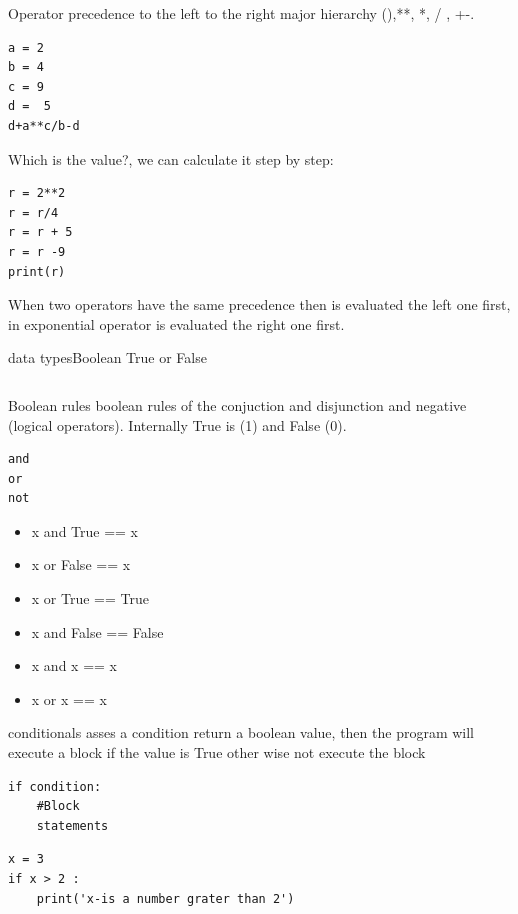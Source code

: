\documentclass{beamer}
\begin{document}
\begin{frame}[fragile]{Operator precedence}
to the left to the right major hierarchy 
(),**, *, / , +-.
\begin{lstlisting}
a = 2
b = 4
c = 9
d =  5
d+a**c/b-d
\end{lstlisting}
Which is the value?, we can calculate it step by step:

\begin{lstlisting}
r = 2**2
r = r/4
r = r + 5
r = r -9
print(r)
\end{lstlisting}
When two operators have the same precedence then is evaluated the left one first, in exponential operator is evaluated the right one first.

\end{frame}






\begin{frame}[fragile]{data types}{Boolean}
True or False
\begin{lstlisting}

\end{lstlisting}
\end{frame}


\begin{frame}[fragile]{Boolean rules}
boolean rules of the conjuction and disjunction and negative (logical operators). Internally True is (1) and False (0).
\begin{lstlisting}
and 
or 
not
\end{lstlisting}
\begin{itemize}
\item x and True == x
\item x or False == x
\item x or True == True
\item x and False == False
\item x and x == x
\item x or x == x
\end{itemize}
\end{frame}


\begin{frame}[fragile]{conditionals}{}
asses a condition return a boolean value, then the program will execute a block if the value is True other wise not execute the block
\begin{lstlisting}
if condition:
	#Block 
	statements
\end{lstlisting}


\begin{lstlisting}
x = 3
if x > 2 :
	print('x-is a number grater than 2')
\end{lstlisting}



\end{frame}
\end{document}
